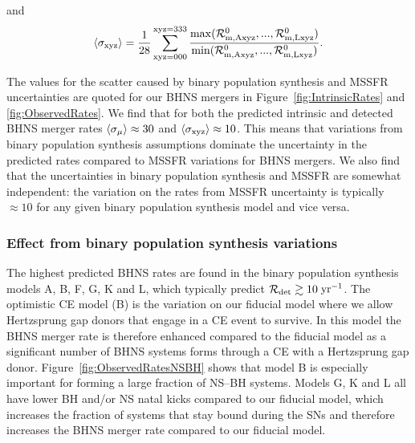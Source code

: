 \documentclass[twocolumn]{aastex63}
\newcommand\rate{\mathcal{R}}
\newcommand\bhnsSingle{BHNS\xspace}
\newcommand{\yearmin}{\ensuremath{\,\rm{yr}^{-1}}\xspace}
\newcommand{\RateObserved}{\ensuremath{\mathcal{R}_{\rm{det}}}\xspace}
\begin{document}
and 
%
\begin{equation}
\langle \sigma_{\rm{xyz}}\rangle = \frac{1}{28} \sum_{\rm{xyz}=000}^{\rm{xyz}=333}
 \frac{\rm{max}(\rate_{\rm{m, Axyz}}^0,... ,\rate_{\rm{m, Lxyz}}^0 )}{\rm{min}(\rate_{\rm{m, Axyz}}^0,... ,\rate_{\rm{m, Lxyz}}^0)}.
\end{equation} 
%

%
The  values for the scatter caused by binary population synthesis and \ac{MSSFR} uncertainties are quoted for our \bhnsSingle mergers   in  Figure~\ref{fig:IntrinsicRates} and \ref{fig:ObservedRates}.  
We find that for both the predicted intrinsic and detected \bhnsSingle merger rates  $\langle \sigma_{\rm{\mu}}\rangle \approx 30$ and $\langle \sigma_{\rm{xyz}}\rangle  \approx 10$. This means that variations from binary population synthesis assumptions  dominate the uncertainty in the predicted rates compared to \ac{MSSFR} variations for \bhnsSingle mergers.  We also find that the uncertainties in binary population synthesis and \ac{MSSFR} are somewhat independent:  the variation on the rates from \ac{MSSFR} uncertainty is typically $\approx 10$ for  any given binary population synthesis model and vice versa. 








\subsubsection{Effect from binary population synthesis variations}


 The highest predicted \bhnsSingle rates are found in the binary population synthesis models A, B, F, G, K and L, which typically predict $\RateObserved \gtrsim 10$\yearmin.    The optimistic \ac{CE} model (B) is the variation on our fiducial model  where we allow Hertzsprung gap donors that engage in a \ac{CE} event to survive.  In this model the \bhnsSingle merger rate is therefore enhanced compared to the fiducial model as a significant number of \bhnsSingle systems forms through a \ac{CE} with a Hertzsprung gap donor. Figure~\ref{fig:ObservedRatesNSBH} shows that model B is especially important for forming a large fraction of NS--BH systems. Models  G, K and L all have lower \ac{BH} and/or \ac{NS} natal kicks compared to our fiducial model, which increases the fraction of systems that stay bound during the \acp{SN} and therefore increases the \bhnsSingle merger rate compared to our fiducial model. 
  
\end{document}
